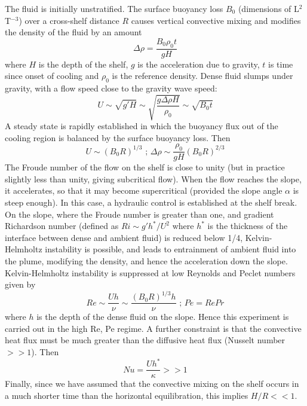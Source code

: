 The fluid is initially unstratified.  The surface buoyancy loss $B_0$
(dimensions of L$^2$T$^{-3}$) over a cross-shelf distance $R$ causes
vertical convective mixing and modifies the density of the fluid by an
amount
\begin{equation}
\Delta \rho = \frac{B_0 \rho_0 t}{g H}
\end{equation}
where $H$ is the depth of the shelf, $g$ is the acceleration due to
gravity, $t$ is time since onset of cooling and $\rho_0$ is the
reference density. Dense fluid slumps under gravity, with a flow speed
close to the gravity wave speed:
\begin{equation}
U
\sim \sqrt{g' H}
\sim \sqrt{ \frac{g \Delta \rho H}{\rho_0} }
\sim \sqrt{B_0 t}
\end{equation}
A steady state is rapidly established in which the buoyancy flux out of 
the cooling region is balanced by the surface buoyancy loss. 
Then 
\begin{equation}
U \sim (B_0 R)^{1/3} \mbox{  ;  } \Delta \rho \sim \frac{\rho_0}{g H} (B_0 R)^{2/3} 
\end{equation}
The Froude number of the flow on the shelf is close to unity (but in 
practice slightly less than unity, giving subcritical flow). 
When the flow reaches the slope, it accelerates, so that it may become 
supercritical (provided the slope angle $ \alpha $ is steep enough). 
In this case, a hydraulic control is established at 
the shelf break. On the slope, where the Froude number is greater 
than one, and gradient Richardson number 
(defined as $Ri \sim g' h^*/U^2$ where $h^*$ is the thickness of the 
interface between dense and ambient fluid) is reduced 
below 1/4, Kelvin-Helmholtz instability is possible, and leads to 
entrainment of ambient fluid into the plume, modifying the 
density, and hence the acceleration down the slope. 
Kelvin-Helmholtz instability is suppressed at low Reynolds and 
Peclet numbers given by 
\begin{equation}
Re \sim \frac{U h}{ \nu} \sim \frac{(B_0 R)^{1/3} h}{\nu} \mbox{  ;  } Pe = Re Pr
\end{equation}
where $h$ is the depth of the dense fluid on the slope. 
Hence this experiment is carried out in the high Re, Pe regime. 
A further constraint is that the convective heat flux must be much greater 
than the diffusive heat flux (Nusselt number $>> 1$). 
Then 
\begin{equation}
Nu = \frac{U h^* }{\kappa} >> 1
\end{equation}
Finally, since we have assumed that the convective mixing on the shelf
occurs in a much shorter time than the horizontal equilibration, 
this implies $H/R << 1$.  

